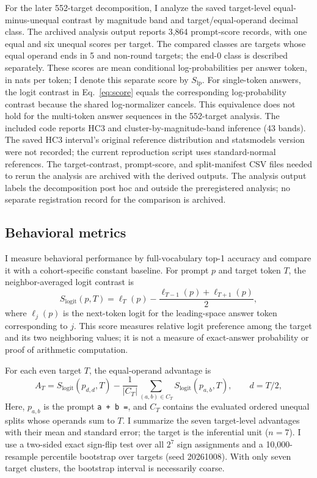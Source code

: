 \documentclass[11pt]{article}
\begin{document}
For the later 552-target decomposition, I analyze the saved target-level equal-minus-unequal contrast by magnitude band and target/equal-operand decimal class. The archived analysis output reports 3,864 prompt-score records, with one equal and six unequal scores per target. The compared classes are targets whose equal operand ends in 5 and non-round targets; the end-0 class is described separately. These scores are mean conditional log-probabilities per answer token, in nats per token; I denote this separate score by $S_{\mathrm{lp}}$. For single-token answers, the logit contrast in Eq.~\ref{eq:score} equals the corresponding log-probability contrast because the shared log-normalizer cancels. This equivalence does not hold for the multi-token answer sequences in the 552-target analysis. The included code reports HC3 and cluster-by-magnitude-band inference (43 bands). The saved HC3 interval's original reference distribution and statsmodels version were not recorded; the current reproduction script uses standard-normal references. The target-contrast, prompt-score, and split-manifest CSV files needed to rerun the analysis are archived with the derived outputs. The analysis output labels the decomposition post hoc and outside the preregistered analysis; no separate registration record for the comparison is archived.



\subsection{Behavioral metrics}

I measure behavioral performance by full-vocabulary top-1 accuracy and compare it with a cohort-specific constant baseline. For prompt $p$ and target token $T$, the neighbor-averaged logit contrast is
\begin{equation}
S_{\mathrm{logit}}(p,T)=\ell_T(p)-\frac{\ell_{T-1}(p)+\ell_{T+1}(p)}{2},
\label{eq:score}
\end{equation}
where $\ell_j(p)$ is the next-token logit for the leading-space answer token corresponding to $j$. This score measures relative logit preference among the target and its two neighboring values; it is not a measure of exact-answer probability or proof of arithmetic computation.

For each even target $T$, the equal-operand advantage is
\begin{equation}
A_T=S_{\mathrm{logit}}(p_{d,d},T)-\frac{1}{|C_T|}\sum_{(a,b)\in C_T}S_{\mathrm{logit}}(p_{a,b},T),\qquad d=T/2,
\label{eq:adv}
\end{equation}
Here, $p_{a,b}$ is the prompt \texttt{a + b =}, and $C_T$ contains the evaluated ordered unequal splits whose operands sum to $T$. I summarize the seven target-level advantages with their mean and standard error; the target is the inferential unit ($n=7$). I use a two-sided exact sign-flip test over all $2^7$ sign assignments and a 10,000-resample percentile bootstrap over targets (seed 20261008). With only seven target clusters, the bootstrap interval is necessarily coarse.
\end{document}
